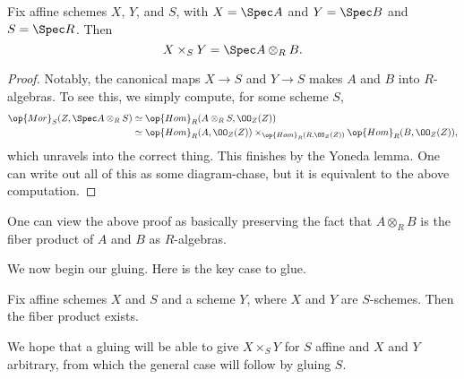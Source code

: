 \documentclass[../notes.tex]{subfiles}
\begin{document}
\begin{lemma}
	Fix affine schemes $X$, $Y$, and $S$, with $X=\Spec A$ and $Y=\Spec B$ and $S=\Spec R$. Then
	\[X\times_SY=\Spec A\otimes_RB.\]
\end{lemma}
\begin{proof}
	Notably, the canonical maps $X\to S$ and $Y\to S$ makes $A$ and $B$ into $R$-algebras. To see this, we simply compute, for some scheme $S$,
	\begin{align*}
		\op{Mor}_S(Z,\Spec A\otimes_RS) &\simeq \op{Hom}_R(A\otimes_RS,\OO_Z(Z)) \\
		&\simeq \op{Hom}_R(A,\OO_Z(Z)) \times_{\op{Hom}_R(R,\OO_Z(Z))} \op{Hom}_R(B,\OO_Z(Z)),
	\end{align*}
	which unravels into the correct thing. This finishes by the Yoneda lemma. One can write out all of this as some diagram-chase, but it is equivalent to the above computation.
\end{proof}
\begin{remark}
	One can view the above proof as basically preserving the fact that $A\otimes_RB$ is the fiber product of $A$ and $B$ as $R$-algebras.
\end{remark}
We now begin our gluing. Here is the key case to glue.
\begin{lemma} \label{lem:keyfibercase}
	Fix affine schemes $X$ and $S$ and a scheme $Y$, where $X$ and $Y$ are $S$-schemes. Then the fiber product exists.
\end{lemma}
We hope that a gluing will be able to give $X\times_SY$ for $S$ affine and $X$ and $Y$ arbitrary, from which the general case will follow by gluing $S$.
\end{document}
